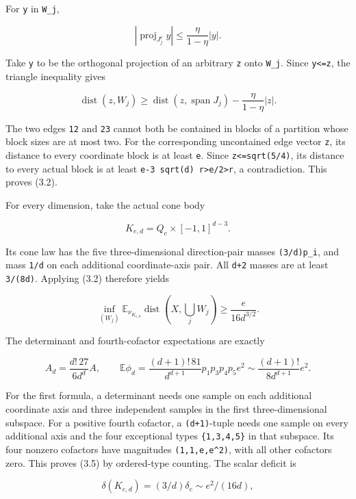\documentclass[
  11pt,
]{article}
\begin{document}
For \texttt{y} in \texttt{W\_j},

\[
 |\operatorname{proj}_{J_j^c}y|
       \le\frac\eta{1-\eta}|y|.
\]

Take \texttt{y} to be the orthogonal projection of an arbitrary
\texttt{z} onto \texttt{W\_j}. Since
\texttt{\textbar{}y\textbar{}\textless{}=\textbar{}z\textbar{}}, the
triangle inequality gives

\[
 \operatorname{dist}(z,W_j)
 \ge\operatorname{dist}(z,\operatorname{span}J_j)
          -\frac\eta{1-\eta}|z|.
\]

The two edges \texttt{12} and \texttt{23} cannot both be contained in
blocks of a partition whose block sizes are at most two. For the
corresponding uncontained edge vector \texttt{z}, its distance to every
coordinate block is at least \texttt{e}. Since
\texttt{\textbar{}z\textbar{}\textless{}=sqrt(5/4)}, its distance to
every actual block is at least
\texttt{e-3\ sqrt(d)\ r\textgreater{}e/2\textgreater{}r}, a
contradiction. This proves (3.2).

For every dimension, take the actual cone body

\[
 K_{e,d}=Q_e\times[-1,1]^{d-3}. \tag{3.3}
\]

Its cone law has the five three-dimensional direction-pair masses
\texttt{(3/d)p\_i}, and mass \texttt{1/d} on each additional
coordinate-axis pair. All \texttt{d+2} masses are at least
\texttt{3/(8d)}. Applying (3.2) therefore yields

\[
 \inf_{(W_j)}\mathbb E_{\nu_{K_{e,d}}}
              \operatorname{dist}(X,\bigcup_jW_j)
       \ge\frac{e}{16d^{3/2}}. \tag{3.4}
\]

The determinant and fourth-cofactor expectations are exactly

\[
 A_d=\frac{d!\,27}{6d^d}A,
 \qquad
 \mathbb E\phi_d=\frac{(d+1)!\,81}{d^{d+1}}
                 p_1p_3p_4p_5e^2
       \sim\frac{(d+1)!}{8d^{d+1}}e^2. \tag{3.5}
\]

For the first formula, a determinant needs one sample on each additional
coordinate axis and three independent samples in the first
three-dimensional subspace. For a positive fourth cofactor, a
\texttt{(d+1)}-tuple needs one sample on every additional axis and the
four exceptional types \texttt{\{1,3,4,5\}} in that subspace. Its four
nonzero cofactors have magnitudes \texttt{(1,1,e,e\^{}2)}, with all
other cofactors zero. This proves (3.5) by ordered-type counting. The
scalar deficit is

\[
 \delta(K_{e,d})=(3/d)\delta_e\sim e^2/(16d), \tag{3.6}
\]
\end{document}
